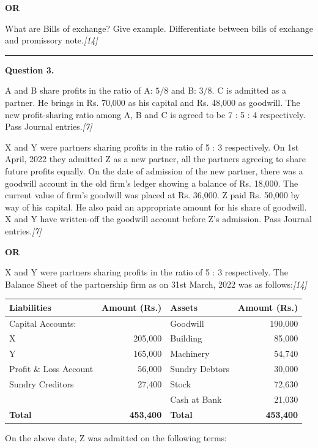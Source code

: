 \documentclass[11pt,a4paper]{article}
\newcommand{\pts}[1]{\hfill   \textit{[#1]}}
\begin{document}
\centerline{   \textbf{OR}}

What are Bills of exchange? Give example. Differentiate between bills of exchange and promissory note.\pts{14}

\medskip\rule{\linewidth}{0.2pt}


\newpage




\noindent   \textbf{Question 3.}

\begin{parts}
  \item A and B share profits in the ratio of A: $5/8$ and B: $3/8$. C is admitted as a partner. He brings in Rs. 70,000 as his capital and Rs. 48,000 as goodwill. The new profit-sharing ratio among A, B and C is agreed to be 7 : 5 : 4 respectively. Pass Journal entries.\pts{7}
  \item X and Y were partners sharing profits in the ratio of 5 : 3 respectively. On 1st April, 2022 they admitted Z as a new partner, all the partners agreeing to share future profits equally. On the date of admission of the new partner, there was a goodwill account in the old firm's ledger showing a balance of Rs. 18,000. The current value of firm's goodwill was placed at Rs. 36,000. Z paid Rs. 50,000 by way of his capital. He also paid an appropriate amount for his share of goodwill. X and Y have written-off the goodwill account before Z's admission. Pass Journal entries.\pts{7}
\end{parts}

\centerline{   \textbf{OR}}

X and Y were partners sharing profits in the ratio of 5 : 3 respectively. The Balance Sheet of the partnership firm as on 31st March, 2022 was as follows:\pts{14}

\begin{center}
  \small
  
\begin{tabular}{|l|r||l|r|}
    \hline
   \textbf{Liabilities} &   \textbf{Amount (Rs.)} &   \textbf{Assets} &   \textbf{Amount (Rs.)} \\
    \hline
    Capital Accounts: & & Goodwill & 190,000 \\
    \quad X & 205,000 & Building & 85,000 \\
    \quad Y & 165,000 & Machinery & 54,740 \\
    Profit \& Loss Account & 56,000 & Sundry Debtors & 30,000 \\
    Sundry Creditors & 27,400 & Stock & 72,630 \\
    & & Cash at Bank & 21,030 \\
    \hline
   \textbf{Total} &   \textbf{453,400} &   \textbf{Total} &   \textbf{453,400} \\
    \hline
  \end{tabular}
\end{center}
On the above date, Z was admitted on the following terms:
\end{document}
